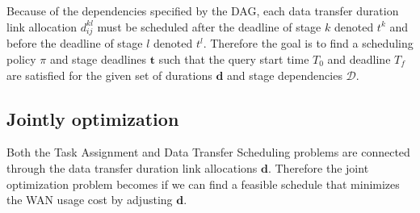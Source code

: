 Because of the dependencies specified by the DAG, each data transfer duration link allocation $d_{ij}^{kl}$ must be scheduled after the deadline of stage $k$ denoted $t^k$ and before the deadline of stage $l$ denoted $t^l$.
Therefore the goal is to find a scheduling policy $\pi$ and stage deadlines $\mathbf{t}$ such that the query start time $T_0$ and deadline $T_f$ are satisfied for the given set of durations $\mathbf{d}$ and stage dependencies $\mathcal{D}$.

\subsection{Jointly optimization}

Both the Task Assignment and Data Transfer Scheduling problems are connected through the data transfer duration link allocations $\mathbf{d}$.
Therefore the joint optimization problem becomes if we can find a feasible schedule that minimizes the WAN usage cost by adjusting $\mathbf{d}$.